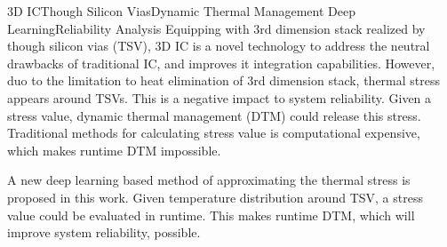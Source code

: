 
\begin{Eabstract}{3D IC}{Though Silicon Vias}{Dynamic Thermal Management}
    {Deep Learning}{Reliability Analysis}
Equipping with 3rd dimension stack realized by though silicon vias (TSV),
3D IC is a novel technology to address the neutral drawbacks of traditional IC,
and improves it integration capabilities.
However, duo to the limitation to heat elimination of 3rd dimension stack,
thermal stress appears around TSVs. This is a negative impact to system reliability.
Given a stress value, dynamic thermal management (DTM) could release this stress.
Traditional methods for calculating stress value is computational expensive,
which makes runtime DTM impossible.

A new deep learning based method of approximating the thermal stress is proposed in this work.
Given temperature distribution around TSV, a stress value could be evaluated in runtime.
This makes runtime DTM, which will improve system reliability, possible.
\end{Eabstract}
